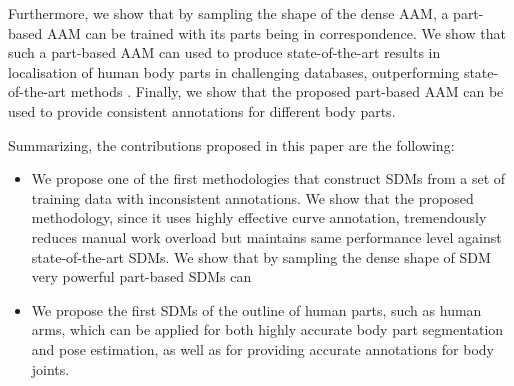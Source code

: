 Furthermore, we show that by sampling the shape of the dense AAM, a part-based AAM can be trained with its parts being in correspondence. We show that such a part-based AAM can used to produce state-of-the-art results in localisation of human body parts in challenging databases, outperforming state-of-the-art methods \cite{pfister2015flowing}. Finally, we show that the proposed part-based AAM can be used to provide consistent annotations for different body parts.




Summarizing, the contributions proposed in this paper are the following:
\begin{itemize}

  \item We propose one of the first methodologies that construct SDMs from a set of training data with inconsistent annotations. We show that the proposed methodology, since it uses highly effective curve annotation, tremendously reduces manual work overload but maintains same performance level against state-of-the-art SDMs. We show that by sampling the dense shape of SDM very powerful part-based SDMs can

  \item We propose the first SDMs of the outline of human parts, such as human arms, which can be applied for both highly accurate body part segmentation and pose estimation, as well as for providing accurate annotations for body joints.

\end{itemize}








